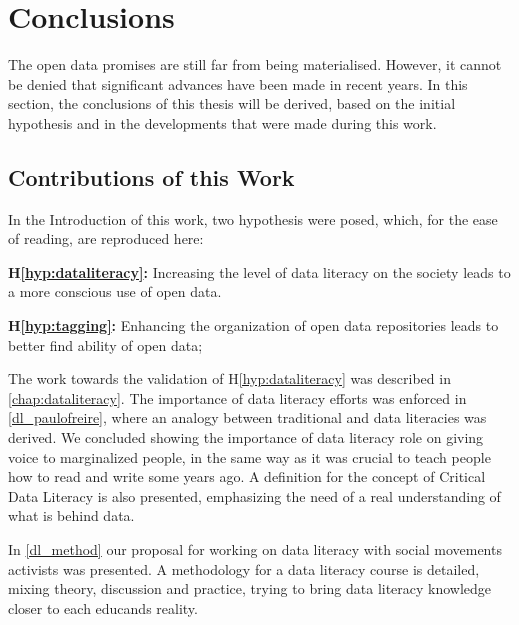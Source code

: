 \chapter{Conclusions}
\label{chap:conclusions}



The open data promises are still far from being materialised.
However, it cannot be denied that significant advances have been made in recent years.
In this section, the conclusions of this thesis will be derived, based on the initial hypothesis and in the developments that were made during this work.

\section{Contributions of this Work}

In the Introduction of this work, two hypothesis were posed, which, for the ease of reading, are reproduced here:

\noindent\textbf{H\ref{hyp:dataliteracy}:} Increasing the level of data literacy on the society leads to a more conscious use of open data.

\noindent\textbf{H\ref{hyp:tagging}:} Enhancing the organization of open data repositories leads to better find ability of open data;

The work towards the validation of H\ref{hyp:dataliteracy} was described in \autoref{chap:dataliteracy}.
The importance of data literacy efforts was enforced in \autoref{dl_paulofreire}, where an analogy between traditional and data literacies was derived.
We concluded showing the importance of data literacy role on giving voice to marginalized people, in the same way as it was crucial to teach people how to read and write some years ago.
A definition for the concept of Critical Data Literacy is also presented, emphasizing the need of a real understanding of what is behind data.

In \autoref{dl_method} our proposal for working on data literacy with social movements activists was presented.
A methodology for a data literacy course is detailed, mixing theory, discussion and practice, trying to bring data literacy knowledge closer to each educands reality.

